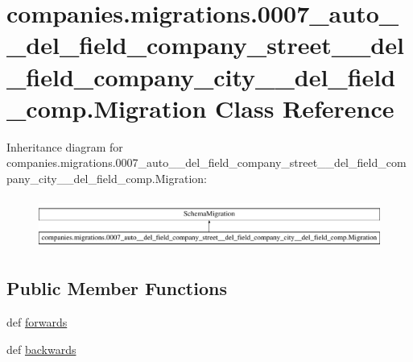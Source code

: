 \hypertarget{classcompanies_1_1migrations_1_10007__auto____del__field__company__street____del__field__company22fc2f9c6f942cc3a3eb71c9155c8d7d}{\section{companies.\-migrations.0007\-\_\-auto\-\_\-\-\_\-del\-\_\-field\-\_\-company\-\_\-street\-\_\-\-\_\-del\-\_\-field\-\_\-company\-\_\-city\-\_\-\-\_\-del\-\_\-field\-\_\-comp.Migration Class Reference}
\label{classcompanies_1_1migrations_1_10007__auto____del__field__company__street____del__field__company22fc2f9c6f942cc3a3eb71c9155c8d7d}
}
Inheritance diagram for companies.\-migrations.0007\-\_\-auto\-\_\-\-\_\-del\-\_\-field\-\_\-company\-\_\-street\-\_\-\-\_\-del\-\_\-field\-\_\-company\-\_\-city\-\_\-\-\_\-del\-\_\-field\-\_\-comp.Migration\-:\begin{figure}[H]
\begin{center}
\leavevmode
\includegraphics[height=1.684211cm]{classcompanies_1_1migrations_1_10007__auto____del__field__company__street____del__field__company22fc2f9c6f942cc3a3eb71c9155c8d7d}
\end{center}
\end{figure}
\subsection*{Public Member Functions}
\begin{DoxyCompactItemize}
\item 
def \hyperlink{classcompanies_1_1migrations_1_10007__auto____del__field__company__street____del__field__company22fc2f9c6f942cc3a3eb71c9155c8d7d_a80880ef782df4e0e0d077b577241be76}{forwards}
\item 
def \hyperlink{classcompanies_1_1migrations_1_10007__auto____del__field__company__street____del__field__company22fc2f9c6f942cc3a3eb71c9155c8d7d_a808d167dd0631ee2414ba9718b390906}{backwards}
\end{DoxyCompactItemize}
